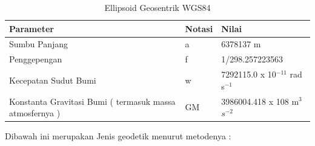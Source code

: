 \begin{table}[h]
\caption{Ellipsoid Geosentrik WGS84}
\centering
\begin{tabular}{p{1.25in}p{1.25in}p{1.25in}}
\hline
Parameter&Notasi&Nilai\\
\hline
Sumbu Panjang & a & 6378137 m\\
Penggepengan & f & 1/298.257223563\\
Kecepatan Sudut Bumi & w & 7292115.0 x 10$^{-11}$ rad s$^{-1}$\\
Konstanta Gravitasi Bumi ( termasuk massa atmosfernya ) & GM & 3986004.418 x 108 m$^3$$ s^{-2}$\\
\hline
\end{tabular}
\label{table:contoh}
\end{table}

Dibawah ini merupakan Jenis geodetik menurut metodenya :

